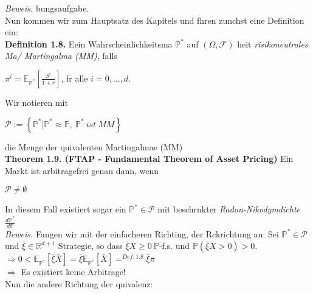 \documentclass[envcountsame,envcountchap,envcountsect,amsart]{svmono}
\begin{document}
\textit{Beweis.} bungsaufgabe.\vspace*{.2cm}\\
Nun kommen wir zum Hauptsatz des Kapitels und fhren zunchst eine Definition ein:\vspace*{.2cm}\\
\textbf{Definition 1.8.} Eein Wahrscheinlichkeitsma $\mathbb{P}^*$ auf $\left(\Omega,\mathcal{F}\right)$ heit \textit{risikoneutrales Ma/ Martingalma (MM)}, falls
\begin{center}
$\pi^i=\mathbb{E}_{\mathbb{P}^*}\left[\frac{S^i}{1+r}\right]$, fr alle $i=0,...,d$.
\end{center}
Wir notieren mit
\begin{center}
$\mathcal{P}:=\left\{\mathbb{P}^*|\mathbb{P}^*\approx\mathbb{P},\ \mathbb{P}^*\ ist\ MM\right\}$
\end{center}
die Menge der quivalenten Martingalmae (MM)\vspace*{.2cm}\\
\textbf{Theorem 1.9. (FTAP - Fundamental Theorem of Asset Pricing)} Ein Markt ist arbitragefrei genau dann, wenn
\begin{center}
$\mathcal{P}\neq\emptyset$
\end{center}
In diesem Fall existiert sogar ein $\mathbb{P}^*\in \mathcal{P}$ mit beschrnkter \textit{Radon-Nikodymdichte} $\frac{d\mathbb{P}^*}{d\mathbb{P}}$\vspace*{.1cm}\\
\textit{Beweis.} Fangen wir mit der einfacheren Richting, der Rckrichtung an: Sei $\mathbb{P}^*\in \mathcal{P}$ und $\bar{\xi}\in\mathds{R}^{d+1}$ Strategie, so dass $\bar{\xi}\bar{X}\geq 0\ \mathbb{P}$-f.s. und $\mathbb{P}\left(\bar{\xi}\bar{X}>0\right)>0$.\vspace*{.2cm}\\
$\Longrightarrow 0<\mathbb{E}_{\mathbb{P}^*}\left[\bar{\xi}\bar{X}\right]=\bar{\xi}\mathbb{E}_{\mathbb{P}^*}\left[\bar{X}\right]=^{Def.\ 1.8}\bar{\xi}\bar{\pi}$\vspace*{.2cm}\\
$\Longrightarrow$ Es existiert keine Arbitrage!\vspace*{.1cm}\\
Nun die andere Richtung der quivalenz:
\end{document}
